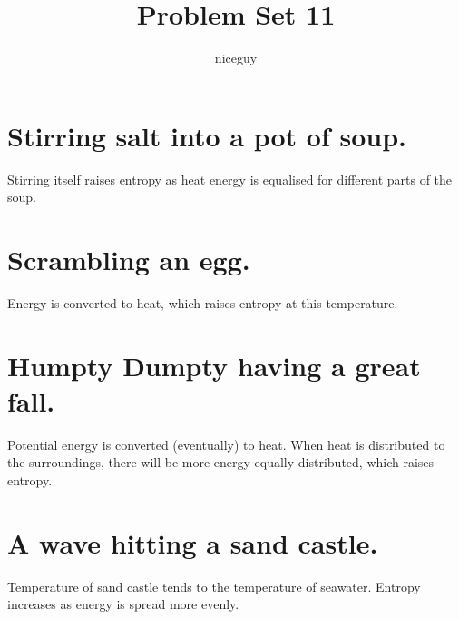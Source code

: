 \documentclass[answers]{exam}
\author{niceguy}
\title{Problem Set 11}
\begin{document}
\maketitle

\begin{questions}


\begin{parts}
    \part{Stirring salt into a pot of soup.}

    \begin{solution}
        Stirring itself raises entropy as heat energy is equalised for different parts of the soup.
    \end{solution}

    \part{Scrambling an egg.}

    \begin{solution}
        Energy is converted to heat, which raises entropy at this temperature.
    \end{solution}

    \part{Humpty Dumpty having a great fall.}

    \begin{solution}
        Potential energy is converted (eventually) to heat. When heat is distributed to the surroundings, there will be more energy equally distributed, which raises entropy.
    \end{solution}

    \part{A wave hitting a sand castle.}

    \begin{solution}
        Temperature of sand castle tends to the temperature of seawater. Entropy increases as energy is spread more evenly.
    \end{solution}


\end{parts}
\end{questions}
\end{document}
